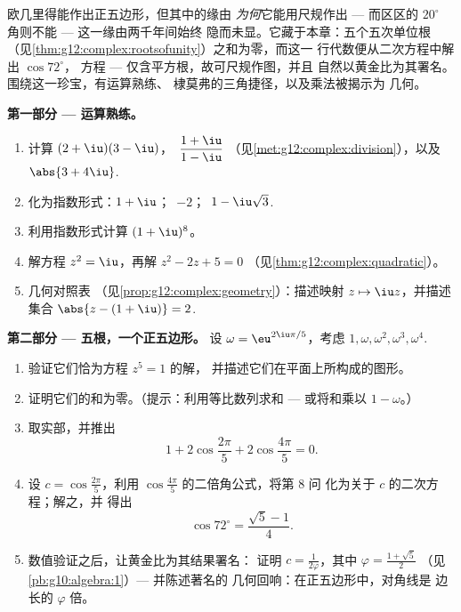 \begin{problem}
\label{pb:g12:complex:1}
欧几里得能作出正五边形，但其中的缘由
\emph{为何}它能用尺规作出 --- 而区区的
$20^\circ$ 角则不能 --- 这一缘由两千年间始终
隐而未显。它藏于本章：五个五次单位根
（见\cref{thm:g12:complex:rootsofunity}）之和为零，而这一
行代数便从二次方程中解出 $\cos 72^\circ$，
方程 --- 仅含平方根，故可尺规作图，并且
自然以黄金比为其署名。围绕这一珍宝，有运算熟练、
棣莫弗的三角捷径，以及乘法被揭示为
几何。

\medskip
\noindent\textbf{第一部分 --- 运算熟练。}
\begin{enumerate}
  \item 计算 $(2 + \iu)(3 - \iu)$，\
        $\dfrac{1 + \iu}{1 - \iu}$
        （见\cref{met:g12:complex:division}），以及
        $\abs{3 + 4\iu}$.
  \item 化为指数形式：$1 + \iu$；\ $-2$；\
        $1 - \iu\sqrt3$.
  \item 利用指数形式计算 $(1 + \iu)^8$。
  \item 解方程 $z^2 = \iu$，再解 $z^2 - 2z + 5 = 0$
        （见\cref{thm:g12:complex:quadratic}）。
  \item 几何对照表
        （见\cref{prop:g12:complex:geometry}）：描述映射
        $z \mapsto \iu z$，并描述集合
        $\abs{z - (1 + \iu)} = 2$.
\end{enumerate}

\medskip
\noindent\textbf{第二部分 --- 五根，一个正五边形。}
设 $\omega = \eu^{2\iu\pi/5}$，考虑
$1, \omega, \omega^2, \omega^3, \omega^4$.
\begin{enumerate}[resume]
  \item 验证它们恰为方程 $z^5 = 1$ 的解，
        并描述它们在平面上所构成的图形。
  \item 证明它们的和为零。（提示：利用等比数列求和
        --- 或将和乘以 $1 - \omega$。）
  \item 取实部，并推出
        \[
        1 + 2\cos\frac{2\pi}{5} + 2\cos\frac{4\pi}{5} = 0 .
        \]
  \item 设 $c = \cos\frac{2\pi}{5}$，利用
        $\cos\frac{4\pi}{5}$ 的二倍角公式，将第 8 问
        化为关于 $c$ 的二次方程；解之，并
        得出
        \[
        \cos 72^\circ = \frac{\sqrt5 - 1}{4} .
        \]
  \item 数值验证之后，让黄金比为其结果署名：
        证明 $c = \frac{1}{2\varphi}$，其中
        $\varphi = \frac{1 + \sqrt5}{2}$
        （见\cref{pb:g10:algebra:1}）--- 并陈述著名的
        几何回响：在正五边形中，对角线是
        边长的 $\varphi$ 倍。
\end{enumerate}


\end{problem}
